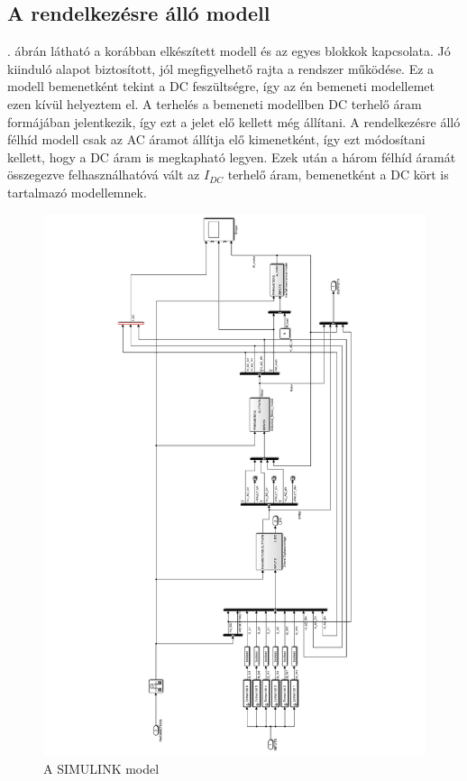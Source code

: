 \subsection{A rendelkezésre álló modell}

. ábrán látható a korábban elkészített modell és az egyes blokkok kapcsolata. Jó kiinduló alapot biztosított, jól megfigyelhető rajta a rendszer működése. Ez a modell bemenetként tekint a DC feszültségre, így az én bemeneti modellemet ezen kívül helyeztem el. A terhelés a bemeneti modellben DC terhelő áram formájában jelentkezik, így ezt a jelet elő kellett még állítani. A rendelkezésre álló félhíd modell csak az AC áramot állítja elő kimenetként, így ezt módosítani kellett, hogy a DC áram is megkapható legyen. Ezek után a három félhíd áramát összegezve felhasználhatóvá vált az $I_{DC}$ terhelő áram, bemenetként a DC kört is tartalmazó modellemnek.


\begin{figure}[]
	\centering
	\includegraphics[width = \textwidth]{figures/hil_model.pdf}
	\caption{A SIMULINK model} 
	\label{fig:original_model}
\end{figure}

